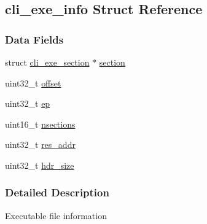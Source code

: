 \hypertarget{structcli__exe__info}{\subsection{cli\-\_\-exe\-\_\-info Struct Reference}
\label{structcli__exe__info}
}
\subsubsection*{Data Fields}
\begin{DoxyCompactItemize}
\item 
struct \hyperlink{structcli__exe__section}{cli\-\_\-exe\-\_\-section} $\ast$ \hyperlink{structcli__exe__info_a1c449c2a02971006b72d8ab755684716}{section}
\item 
uint32\-\_\-t \hyperlink{structcli__exe__info_a894bdfa2d603d8343f8ef01dda6fcd23}{offset}
\item 
uint32\-\_\-t \hyperlink{structcli__exe__info_afaed4671662028c061ab84eefcce0546}{ep}
\item 
uint16\-\_\-t \hyperlink{structcli__exe__info_aa4af5e526457df524fc9a4ba46803a70}{nsections}
\item 
uint32\-\_\-t \hyperlink{structcli__exe__info_ac0f1b36bb8a1eeb981958dc4643f67dd}{res\-\_\-addr}
\item 
uint32\-\_\-t \hyperlink{structcli__exe__info_af2492dd421362ffced98eb583964b310}{hdr\-\_\-size}
\end{DoxyCompactItemize}


\subsubsection{Detailed Description}
Executable file information 

